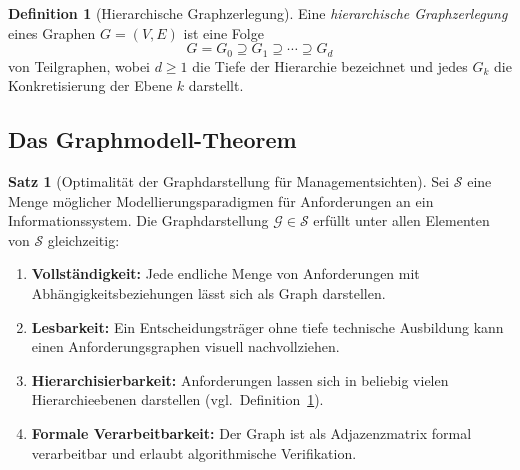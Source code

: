 ﻿\documentclass[a4paper,12pt]{article}
\theoremstyle{definition}
\newtheorem{definition}{Definition}
\newtheorem{satz}{Satz}
\begin{document}
\begin{definition}[Hierarchische Graphzerlegung]
\label{def:hierarchie}
Eine \emph{hierarchische Graphzerlegung} eines Graphen $G = (V, E)$ ist eine Folge
\[
  G = G_0 \supseteq G_1 \supseteq \cdots \supseteq G_d
\]
von Teilgraphen, wobei $d \geq 1$ die Tiefe der Hierarchie bezeichnet und jedes
$G_k$ die Konkretisierung der Ebene $k$ darstellt.
\end{definition}

\subsection{Das Graphmodell-Theorem}

\begin{satz}[Optimalität der Graphdarstellung für Managementsichten]
\label{satz:graphoptimal}
Sei $\mathcal{S}$ eine Menge möglicher Modellierungsparadigmen für Anforderungen an ein
Informationssystem. Die Graphdarstellung
$\mathcal{G} \in \mathcal{S}$ erfüllt unter allen Elementen von $\mathcal{S}$ gleichzeitig:
\begin{enumerate}
  \item \textbf{Vollständigkeit:} Jede endliche Menge von Anforderungen mit
        Abhängigkeitsbeziehungen lässt sich als Graph darstellen.
  \item \textbf{Lesbarkeit:} Ein Entscheidungsträger ohne tiefe technische Ausbildung kann
        einen Anforderungsgraphen visuell nachvollziehen.
  \item \textbf{Hierarchisierbarkeit:} Anforderungen lassen sich in beliebig vielen
        Hierarchieebenen darstellen (vgl.\ Definition~\ref{def:hierarchie}).
  \item \textbf{Formale Verarbeitbarkeit:} Der Graph ist als Adjazenzmatrix formal
        verarbeitbar und erlaubt algorithmische Verifikation.
\end{enumerate}
\end{satz}
\end{document}
